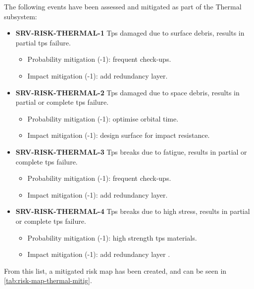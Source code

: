 \noindent The following events have been assessed and mitigated as part of the Thermal subsystem:

\begin{itemize}
	 \item \textbf{SRV-RISK-THERMAL-1} Tps damaged due to surface debris, results in partial tps failure.
	\begin{itemize}
		 \item Probability mitigation (-1):  frequent check-ups.		 \item Impact mitigation (-1):  add redundancy layer.	\end{itemize}
	 \item \textbf{SRV-RISK-THERMAL-2} Tps damaged due to space debris, results in partial or complete tps failure.
	\begin{itemize}
		 \item Probability mitigation (-1):  optimise orbital time.		 \item Impact mitigation (-1): design surface for impact resistance.	\end{itemize}
	 \item \textbf{SRV-RISK-THERMAL-3} Tps breaks due to fatigue, results in partial or complete tps failure.
	\begin{itemize}
		 \item Probability mitigation (-1):  frequent check-ups.		 \item Impact mitigation (-1):  add redundancy layer.	\end{itemize}
	 \item \textbf{SRV-RISK-THERMAL-4} Tps breaks due to high stress, results in partial or complete tps failure.
	\begin{itemize}
		 \item Probability mitigation (-1):  high strength tps materials.		 \item Impact mitigation (-1):  add redundancy layer .	\end{itemize}
\end{itemize}

\noindent From this list, a mitigated risk map has been created, and can be seen in \autoref{tab:risk-map-thermal-mitig}.

